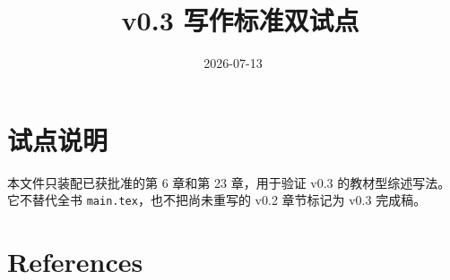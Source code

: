 \documentclass[UTF8,a4paper,12pt,openany]{ctexbook}
\title{\ReportTitle\ v0.3 写作标准双试点}
\author{\ReportAuthor}
\date{2026-07-13}
\begin{document}
\frontmatter
\maketitle
\chapter*{试点说明}
本文件只装配已获批准的第 6 章和第 23 章，用于验证 v0.3 的教材型综述写法。它不替代全书 \texttt{main.tex}，也不把尚未重写的 v0.2 章节标记为 v0.3 完成稿。
\tableofcontents

\mainmatter



\backmatter
\chapter{References}
\printbibliography[heading=none]
\end{document}
